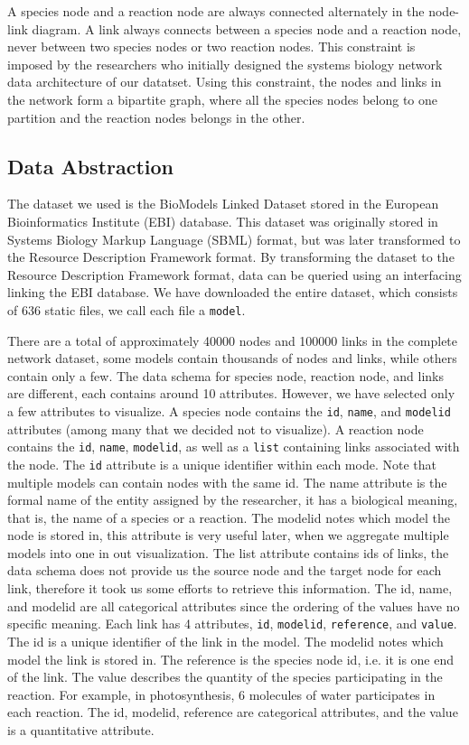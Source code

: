 \documentclass[journal]{vgtc}                %
\begin{document}
A species node and a reaction node are always connected alternately in the node-link diagram. A link always connects between a species node and a reaction node, never between two species nodes or two reaction nodes. This constraint is imposed by the researchers who initially designed the systems biology network data architecture of our datatset. Using this constraint, the nodes and links in the network form a bipartite graph, where all the species nodes belong to one partition and the reaction nodes belongs in the other.

\subsection{Data Abstraction}
The dataset we used is the BioModels Linked Dataset stored in the European Bioinformatics Institute (EBI) database. This dataset was originally stored in Systems Biology Markup Language
(SBML) format, but was later transformed to the Resource Description Framework format. By transforming the dataset to the Resource Description Framework format, data can be queried using an interfacing linking the EBI database. We have downloaded the entire dataset, which consists of 636 static files, we call each file a \texttt{model}. 

There are a total of approximately 40000 nodes and 100000 links in the complete network dataset, some models contain thousands of nodes and links, while others contain only a few. The data schema for species node, reaction node, and links are different, each contains around 10 attributes. However, we have selected only a few attributes to visualize. A species node contains the \texttt{id}, \texttt{name}, and \texttt{model\textunderscore id} attributes (among many that we decided not to visualize). A reaction node contains the \texttt{id}, \texttt{name}, \texttt{model\textunderscore id}, as well as a \texttt{list} containing links associated with the node. The \texttt{id} attribute is a unique identifier within each mode. Note that multiple models can contain nodes with the same id. The name attribute is the formal name of the entity assigned by the researcher, it has a biological meaning, that is, the name of a species or a reaction. The model\textunderscore id notes which model the node is stored in, this attribute is very useful later, when we aggregate multiple models into one in out visualization. The list attribute contains ids of links, the data schema does not provide us the source node and the target node for each link, therefore it took us some efforts to retrieve this information. The id, name, and model\textunderscore id are all categorical attributes since the ordering of the values have no specific meaning. Each link has 4 attributes, \texttt{id}, \texttt{model\textunderscore id}, \texttt{reference}, and \texttt{value}. The id is a unique identifier of the link in the model. The model\textunderscore id notes which model the link is stored in. The reference is the species node id, i.e. it is one end of the link. The value describes the quantity of the species participating in the reaction. For example, in photosynthesis, 6 molecules of water participates in each reaction. The id, model\textunderscore id, reference are categorical attributes, and the value is a quantitative attribute.
\end{document}
